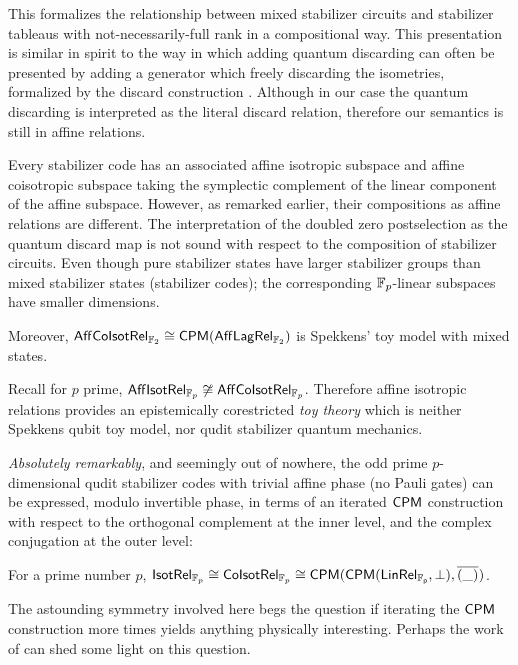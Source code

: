 This formalizes the relationship between mixed stabilizer circuits and stabilizer tableaus with not-necessarily-full rank in  a compositional way. This presentation is similar in spirit to the way in which adding quantum discarding can often be presented by adding a generator which freely discarding the isometries, formalized by the discard construction \cite{discard}. Although in our case the quantum discarding is interpreted as the literal discard relation, therefore our semantics is still in affine relations.



Every stabilizer code has an associated affine isotropic subspace and affine coisotropic subspace taking the symplectic complement of the linear component of the affine subspace. However, as remarked earlier, their compositions as affine relations are different. The interpretation of the doubled zero postselection as the quantum discard map is not sound with respect to the composition of stabilizer circuits. 
 Even though pure stabilizer states have larger stabilizer groups than mixed stabilizer states (stabilizer codes); the corresponding $\mathbb{F}_p$-linear subspaces have smaller dimensions.


\begin{corollary}
Moreover, $\mathsf{Aff}{\sf Co}{\sf Isot}\mathsf{Rel}_{\mathbb{F}_2}\cong \mathsf{CPM}(\mathsf{Aff}\mathsf{Lag}\mathsf{Rel}_{\mathbb{F}_2})$ is Spekkens' toy model with mixed states.
\end{corollary}

Recall for $p$ prime, $\mathsf{Aff}{\sf Isot}\mathsf{Rel}_{\mathbb{F}_p} \not \cong \mathsf{Aff}{\sf Co}{\sf Isot}\mathsf{Rel}_{\mathbb{F}_p}$. Therefore affine isotropic relations provides an epistemically corestricted {\em toy theory} which is neither Spekkens qubit toy model, nor qudit stabilizer quantum mechanics.

{\em Absolutely remarkably}, and seemingly out of nowhere, the odd prime $p$-dimensional qudit  stabilizer codes with trivial affine phase (no Pauli gates) can be expressed, modulo invertible phase, in terms of an iterated $\mathsf{CPM}$ construction with respect to the orthogonal complement at the inner level, and the complex conjugation at the outer level:
\begin{corollary}
For a prime number $p$, ${\sf Isot}\mathsf{Rel}_{\mathbb{F}_p}\cong{\sf Co}{\sf Isot}\mathsf{Rel}_{\mathbb{F}_p}\cong \mathsf{CPM}(\mathsf{CPM}(\sf LinRel_{\mathbb{F}_p},\perp),\overline{(\_)}\hspace*{.01cm})$.
\end{corollary}
The astounding symmetry involved here begs the question if iterating the $\mathsf{CPM}$ construction more times yields anything physically interesting. Perhaps the work of \cite{CPMho} can shed some light on this question. 

